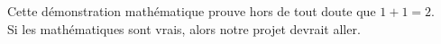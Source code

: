 \documentclass[10pt,a4paper,final]{article}
\begin{document}
\bigskip


\bigskip


\bigskip


\bigskip

\begin{flushleft}
Cette démonstration mathématique prouve hors de tout doute que $1 + 1 = 2$.\\ Si les mathématiques sont vrais, alors notre projet devrait aller.

\end{flushleft}
\end{document}

